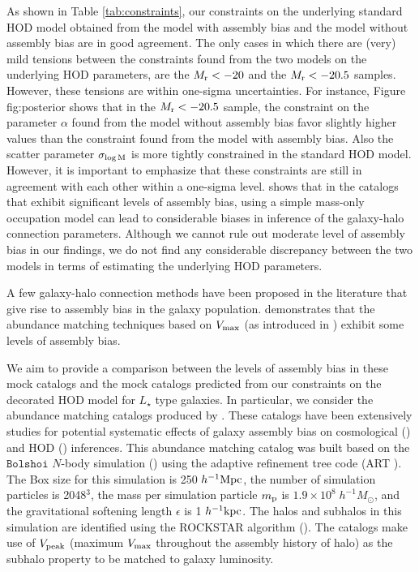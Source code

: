 As shown in Table \ref{tab:constraints}, our constraints on the underlying standard HOD model obtained from the model with assembly bias and the model without assembly bias are in good agreement. The only cases in which there are (very) mild tensions between the constraints found from the two models on the underlying HOD parameters, are the $M_{\rm r}<-20$ and the $M_{\rm r}<-20.5$ samples. However, these tensions are within one-sigma uncertainties. For instance, Figure {fig:posterior} shows that in the $M_{\rm r}<-20.5$ sample, the constraint on the parameter $\alpha$ found from the model without assembly bias favor slightly higher values than the constraint found from the model with assembly bias. Also the scatter parameter $\sigma_{\log \rm M}$ is more tightly constrained in the standard HOD model. However, it is important to emphasize that these constraints are still in agreement with each other within a one-sigma level. \citealt{arz2014} shows that in the catalogs that exhibit significant levels of assembly bias, using a simple mass-only occupation model can lead to considerable biases in inference of the galaxy-halo connection parameters. Although we cannot rule out moderate level of assembly bias in our findings, we do not find any considerable discrepancy between the two models in terms of estimating the underlying HOD parameters. 
 
A few galaxy-halo connection methods have been proposed in the literature that give rise to assembly bias in the galaxy population. \citealt{arz2014} demonstrates that the abundance matching techniques based on $V_{\rm max }$ (as introduced in \citealt{hw2013,reddick2013}) exhibit some levels of assembly bias. 

We aim to provide a comparison between the levels of assembly bias in these mock catalogs and the mock catalogs predicted from our constraints on the decorated HOD model for $L_{\star}$ type galaxies. In particular, we consider the abundance matching catalogs produced by \citealt{hw2013}. These catalogs have been extensively studies for potential systematic effects of galaxy assembly bias on cosmological (\citealt{edHOD-weinberg}) and HOD (\citealt{arz2014}) inferences. This abundance matching catalog was built based on the $\mathtt{Bolshoi}$ $N$-body simulation (\citealt{Klypin2011}) using the adaptive refinement tree code (ART \citealt{art}). The Box size for this simulation is 250 $h^{-1} \rm{Mpc}$, the number of simulation particles is 2048$^3$, the mass per simulation particle $m_{\rm p}$ is $1.9 \times 10^{8} \; h^{-1} M_{\odot}$, and the gravitational softening length $\epsilon$ is 1 $h^{-1} \rm{kpc}$. The halos and subhalos in this simulation are identified using the ROCKSTAR algorithm (\citealt{rockstar}). 
The \citealt{hw2013} catalogs make use of $V_{\rm peak}$ (maximum $V_{\rm max}$ throughout the assembly history of halo) as the subhalo property to be matched to galaxy luminosity. 

